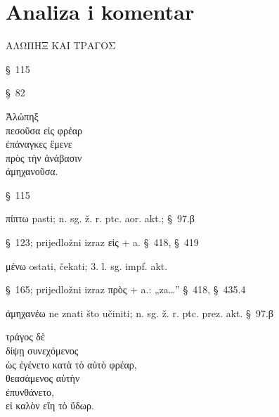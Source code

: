 \section*{Analiza i komentar}


{\large
\begin{greek}
\noindent ΑΛΩΠΗΞ ΚΑΙ ΤΡΑΓΟΣ\\

\end{greek}
}

\begin{description}[noitemsep]
\item[ΑΛΩΠΗΞ] §~115
\item[ΤΡΑΓΟΣ] §~82
\end{description}


{\large
\begin{greek}
\noindent Ἀλώπηξ \\
\tabto{2em} πεσοῦσα εἰς φρέαρ \\
ἐπάναγκες ἔμενε \\
\tabto{2em} πρὸς τὴν ἀνάβασιν \\
\tabto{4em} ἀμηχανοῦσα. \\

\end{greek}
}

\begin{description}[noitemsep]
\item[Ἀλώπηξ] §~115
\item[πεσοῦσα] πίπτω pasti; n. sg. ž. r. ptc. aor. akt.; §~97.β
\item[εἰς φρέαρ] §~123; prijedložni izraz εἰς + a. §~418, §~419
\item[ἔμενε] μένω ostati, čekati; 3. l. sg. impf. akt.
\item[πρὸς τὴν ἀνάβασιν] §~165; prijedložni izraz πρὸς + a.: „za\dots''  §~418, §~435.4
\item[ἀμηχανοῦσα] ἀμηχανέω ne znati što učiniti; n. sg. ž. r. ptc. prez. akt. §~97.β

\end{description}


{\large
\begin{greek}
\noindent τράγος δὲ\\
\tabto{2em} δίψῃ συνεχόμενος \\
\tabto{4em} ὡς ἐγένετο κατὰ τὸ αὐτὸ φρέαρ, \\
θεασάμενος αὐτὴν \\
ἐπυνθάνετο, \\
\tabto{2em} εἰ καλὸν εἴη τὸ ὕδωρ.\\

\end{greek}
}

